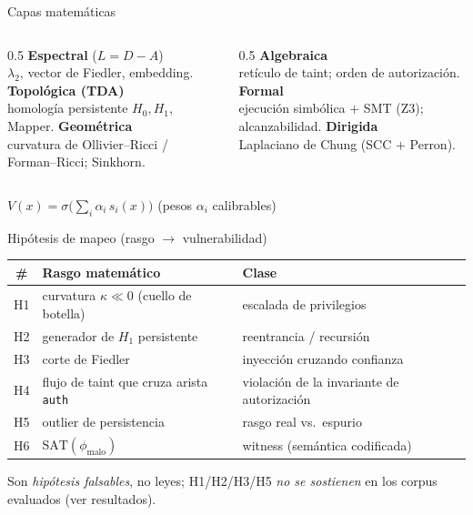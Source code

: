 \documentclass[aspectratio=169,11pt]{beamer}
\begin{document}
\begin{frame}{Capas matemáticas}
  \begin{columns}[T]
    \begin{column}{0.5\textwidth}
      \textbf{Espectral} ($L=D-A$)\\
      $\lambda_2$, vector de Fiedler, embedding.
      \vspace{2mm}
      \textbf{Topológica (TDA)}\\
      homología persistente $H_0,H_1$, Mapper.
      \vspace{2mm}
      \textbf{Geométrica}\\
      curvatura de Ollivier--Ricci / Forman--Ricci; Sinkhorn.
    \end{column}
    \begin{column}{0.5\textwidth}
      \textbf{Algebraica}\\
      retículo de taint; orden de autorización.
      \vspace{2mm}
      \textbf{Formal}\\
      ejecución simbólica $+$ SMT (Z3); alcanzabilidad.
      \vspace{2mm}
      \textbf{Dirigida}\\
      Laplaciano de Chung (SCC $+$ Perron).
    \end{column}
  \end{columns}
  \vspace{3mm}
  \begin{center}
  $V(x) = \sigma\!\big(\sum_i \alpha_i\, s_i(x)\big)$ \quad (pesos $\alpha_i$ calibrables)
  \end{center}
\end{frame}

\begin{frame}{Hipótesis de mapeo (rasgo $\to$ vulnerabilidad)}
  \begin{center}
  \begin{tabular}{cll}
  \toprule
  \# & Rasgo matemático & Clase \\
  \midrule
  H1 & curvatura $\kappa \ll 0$ (cuello de botella) & escalada de privilegios \\
  H2 & generador de $H_1$ persistente & reentrancia / recursión \\
  H3 & corte de Fiedler & inyección cruzando confianza \\
  H4 & flujo de taint que cruza arista \texttt{auth} & violación de la invariante de autorización \\
  H5 & outlier de persistencia & rasgo real vs.\ espurio \\
  H6 & $\mathrm{SAT}(\phi_{\text{malo}})$ & witness (semántica codificada) \\
  \bottomrule
  \end{tabular}
  \end{center}
  \vspace{2mm}
  \footnotesize Son \emph{hipótesis falsables}, no leyes; H1/H2/H3/H5 \emph{no se
  sostienen} en los corpus evaluados (ver resultados).
\end{frame}
\end{document}
